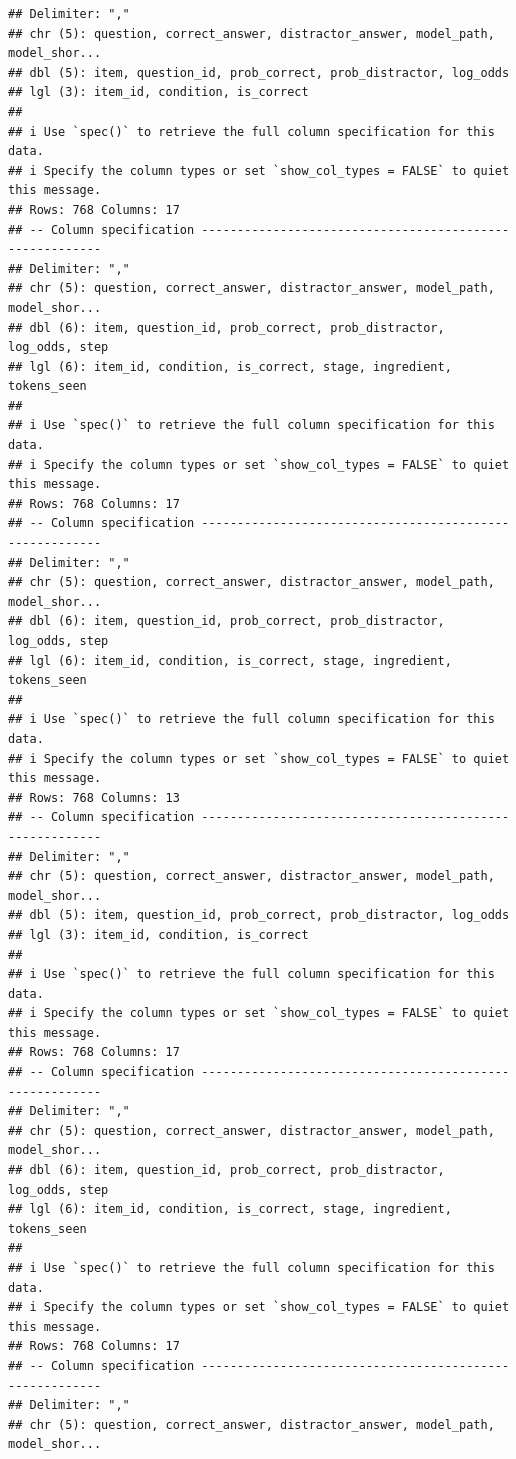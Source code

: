 \documentclass[
]{article}
\begin{document}
\begin{verbatim}
## Delimiter: ","
## chr (5): question, correct_answer, distractor_answer, model_path, model_shor...
## dbl (5): item, question_id, prob_correct, prob_distractor, log_odds
## lgl (3): item_id, condition, is_correct
## 
## i Use `spec()` to retrieve the full column specification for this data.
## i Specify the column types or set `show_col_types = FALSE` to quiet this message.
## Rows: 768 Columns: 17
## -- Column specification --------------------------------------------------------
## Delimiter: ","
## chr (5): question, correct_answer, distractor_answer, model_path, model_shor...
## dbl (6): item, question_id, prob_correct, prob_distractor, log_odds, step
## lgl (6): item_id, condition, is_correct, stage, ingredient, tokens_seen
## 
## i Use `spec()` to retrieve the full column specification for this data.
## i Specify the column types or set `show_col_types = FALSE` to quiet this message.
## Rows: 768 Columns: 17
## -- Column specification --------------------------------------------------------
## Delimiter: ","
## chr (5): question, correct_answer, distractor_answer, model_path, model_shor...
## dbl (6): item, question_id, prob_correct, prob_distractor, log_odds, step
## lgl (6): item_id, condition, is_correct, stage, ingredient, tokens_seen
## 
## i Use `spec()` to retrieve the full column specification for this data.
## i Specify the column types or set `show_col_types = FALSE` to quiet this message.
## Rows: 768 Columns: 13
## -- Column specification --------------------------------------------------------
## Delimiter: ","
## chr (5): question, correct_answer, distractor_answer, model_path, model_shor...
## dbl (5): item, question_id, prob_correct, prob_distractor, log_odds
## lgl (3): item_id, condition, is_correct
## 
## i Use `spec()` to retrieve the full column specification for this data.
## i Specify the column types or set `show_col_types = FALSE` to quiet this message.
## Rows: 768 Columns: 17
## -- Column specification --------------------------------------------------------
## Delimiter: ","
## chr (5): question, correct_answer, distractor_answer, model_path, model_shor...
## dbl (6): item, question_id, prob_correct, prob_distractor, log_odds, step
## lgl (6): item_id, condition, is_correct, stage, ingredient, tokens_seen
## 
## i Use `spec()` to retrieve the full column specification for this data.
## i Specify the column types or set `show_col_types = FALSE` to quiet this message.
## Rows: 768 Columns: 17
## -- Column specification --------------------------------------------------------
## Delimiter: ","
## chr (5): question, correct_answer, distractor_answer, model_path, model_shor...

\end{verbatim}
\end{document}
